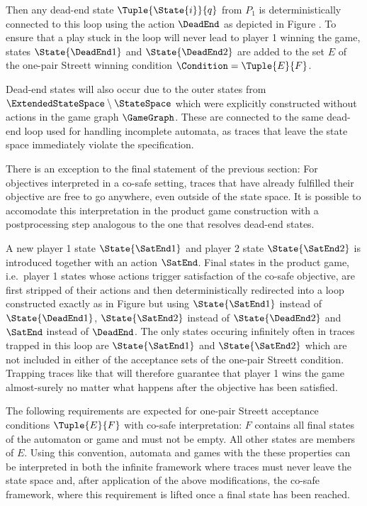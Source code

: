     Then any dead-end state $\Tuple{\State{i}}{q}$ from $P_1$ is deterministically connected to this loop using the action $\DeadEnd$ as depicted in Figure .
    To ensure that a play stuck in the loop will never lead to player 1 winning the game, states $\State{\DeadEnd1}$ and $\State{\DeadEnd2}$ are added to the set $E$ of the one-pair Streett winning condition $\Condition = \Tuple{E}{F}$.

    Dead-end states will also occur due to the outer states from $\ExtendedStateSpace \setminus \StateSpace$ which were explicitly constructed without actions in the game graph $\GameGraph$.
    These are connected to the same dead-end loop used for handling incomplete automata, as traces that leave the state space immediately violate the specification.

\stopsubsection


\startsubsection[title={Co-safe Interpretation},reference=sec:abstraction-product-cosafe]

    There is an exception to the final statement of the previous section:
    For objectives interpreted in a co-safe setting, traces that have already fulfilled their objective are free to go anywhere, even outside of the state space.
    It is possible to accomodate this interpretation in the product game construction with a postprocessing step analogous to the one that resolves dead-end states.

    A new player 1 state $\State{\SatEnd1}$ and player 2 state $\State{\SatEnd2}$ is introduced together with an action $\SatEnd$.
    Final states in the product game, i.e.\ player 1 states whose actions trigger satisfaction of the co-safe objective, are first stripped of their actions and then deterministically redirected into a loop constructed exactly as in Figure  but using $\State{\SatEnd1}$ instead of $\State{\DeadEnd1}$, $\State{\SatEnd2}$ instead of $\State{\DeadEnd2}$ and $\SatEnd$ instead of $\DeadEnd$.
    The only states occuring infinitely often in traces trapped in this loop are $\State{\SatEnd1}$ and $\State{\SatEnd2}$ which are not included in either of the acceptance sets of the one-pair Streett condition.
    Trapping traces like that will therefore guarantee that player 1 wins the game almost-surely no matter what happens after the objective has been satisfied.

    The following requirements are expected for one-pair Streett acceptance conditions $\Tuple{E}{F}$ with co-safe interpretation:
    $F$ contains all final states of the automaton or game and must not be empty.
    All other states are members of $E$.
    Using this convention, automata and games with the these properties can be interpreted in both the infinite framework where traces must never leave the state space and, after application of the above modifications, the co-safe framework, where this requirement is lifted once a final state has been reached.

\stopsubsection

